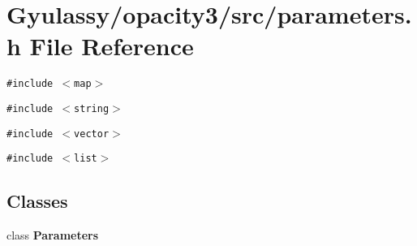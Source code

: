 \section{Gyulassy/opacity3/src/parameters.h File Reference}
\label{parameters_8h}
{\tt \#include $<$map$>$}\par
{\tt \#include $<$string$>$}\par
{\tt \#include $<$vector$>$}\par
{\tt \#include $<$list$>$}\par
\subsection*{Classes}
\begin{CompactItemize}
\item 
class {\bf Parameters}
\end{CompactItemize}
